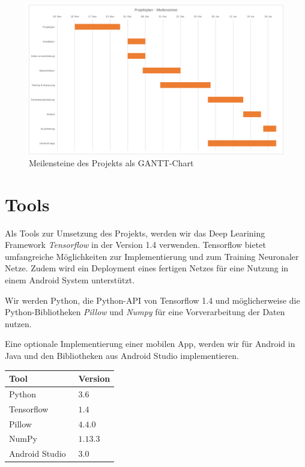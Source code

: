 \documentclass[%
   10pt,              %
   a4paper,           %
   DIV10,             %
]{scrartcl}%
\begin{document}
 \begin{figure}[ht]
	\centering
 \includegraphics[width=\textwidth]{fig/gantt_projektplan}
 \caption{Meilensteine des Projekts als GANTT-Chart}
	\label{fig_gantt}
 \end{figure}

\newpage
\section*{Tools}
Als Tools zur Umsetzung des Projekts, werden wir das Deep Learining Framework \textit{Tensorflow} \cite{tensorflow2015-whitepaper} in der Version 1.4 verwenden. Tensorflow bietet umfangreiche Möglichkeiten zur Implementierung und zum Training Neuronaler Netze. Zudem wird ein Deployment eines fertigen Netzes für eine Nutzung in einem Android System unterstützt.

Wir werden Python, die Python-API von Tensorflow 1.4 und möglicherweise die Python-Bibliotheken \textit{Pillow} und \textit{Numpy} \cite{numpy} für eine Vorverarbeitung der Daten nutzen.

Eine optionale Implementierung einer mobilen App, werden wir für Android in Java und den Bibliotheken aus Android Studio \cite{androidstudio} implementieren. 

\begin{center}
	
\begin{tabular}{ll}
	\toprule
	Tool & Version \\
	\midrule
	Python & $3.6$  \\
	Tensorflow~\cite{tensorflow2015-whitepaper}  & $1.4$   \\
	Pillow  & $4.4.0$    \\
	NumPy~\cite{numpy}  & $1.13.3$    \\
	Android Studio~\cite{androidstudio}  & $3.0$    \\
	\bottomrule
\end{tabular}

\end{center}
\end{document}
